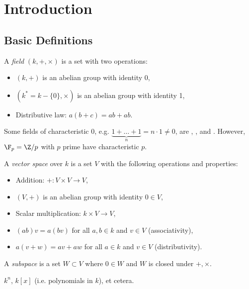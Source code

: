 \documentclass{notes}
\begin{document}
\section{Introduction}

\lipsum[1]

\subsection{Basic Definitions}

\begin{defn}
    A \emph{field} $\left( k,+,\times  \right) $ is a set with two operations:
    \begin{itemize}
        \item $\left( k,+ \right) $ is an abelian group with identity 0,
        \item $\left( k^*=k-\{0\} ,\times  \right) $ is an abelian group with identity 1,
        \item Distributive law: $a\left( b+c \right) = ab+ab$.
    \end{itemize}
\end{defn}

\begin{example}
    Some fields of characteristic 0, e.g. $\underbrace{1+\ldots+1}_{n}=n\cdot 1\neq 0$, are \Q, \R, and \C.
    However,  $\F_p=\Z /p$ with $p$ prime have characteristic $p$.
\end{example}

\begin{defn}
    A \emph{vector space} over $k$ is a set $V$ with the following operations and properties:
    \begin{itemize}
        \item Addition: $+\colon V\times V \to V $,
        \item $\left( V,+ \right) $ is an abelian group with identity $0\in V$,
        \item Scalar multiplication: $k\times V\to V$,
        \item $(ab)v=a(bv)$ for all  $a,b\in k$ and $v\in V$ (associativity),
        \item $a(v+w)=av+aw$ for all $a\in k$ and $v\in V$ (distributivity).
    \end{itemize}

    A \emph{subspace} is a set $W\subset V$ where $0\in W$ and $W$ is closed under $+,\times $.
\end{defn}

\begin{example}
    $k^n$, $k[x]$ (i.e. polynomials in $k$), et cetera.
\end{example}
\end{document}

